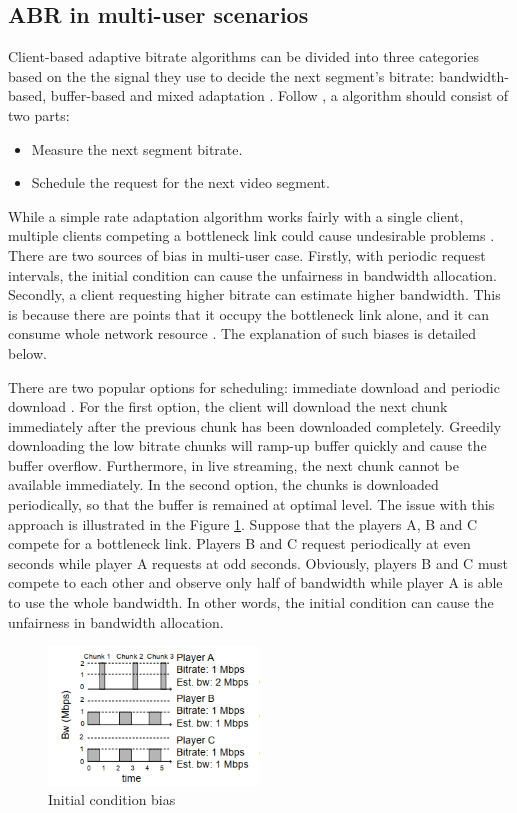 \documentclass[journal]{IEEEtran}
\begin{document}
\subsection{ABR in multi-user scenarios}
Client-based adaptive bitrate algorithms can be divided into three categories based on the the signal they use to decide the next segment's bitrate: bandwidth-based, buffer-based and mixed adaptation \cite{ABR cats}. Follow \cite{PANDA}, a algorithm should consist of two parts: \begin{itemize}
    \item Measure the next segment bitrate.
    \item Schedule the request for the next video segment.
\end{itemize}
\par While a simple rate adaptation algorithm works fairly with a single client, multiple clients competing a bottleneck link could cause undesirable problems \cite{FESTIVE}. There are two sources of bias in multi-user case. Firstly, with periodic request intervals, the initial condition can cause the unfairness in bandwidth allocation. Secondly, a client requesting higher bitrate can estimate higher bandwidth. This is because there are points that it occupy the bottleneck link alone, and it can consume whole network resource \cite{FESTIVE}. The explanation of such biases is detailed below. 
\par There are two popular options for scheduling: immediate download and periodic download \cite{FESTIVE}. For the first option, the client will download the next chunk immediately after the previous chunk has been downloaded completely. Greedily downloading the low bitrate chunks will ramp-up buffer quickly and cause the buffer overflow. Furthermore, in live streaming, the next chunk cannot be available immediately. In the second option, the chunks is downloaded periodically, so that the buffer is remained at optimal level. The issue with this approach is illustrated in the Figure \ref{ini bias}. Suppose that the players A, B and C compete for a bottleneck link. Players B and C request periodically at even seconds while player A requests at odd seconds. Obviously, players B and C must compete to each other and observe only half of bandwidth while player A is able to use the whole bandwidth. In other words, the initial condition can cause the unfairness in bandwidth allocation.
\begin{figure}[!h]
	\centering
	
	\includegraphics[width=0.5\textwidth]{images/IniBias.PNG}
	
	
	
	\caption{Initial condition bias}
	\label {ini bias}
	
\end{figure}
\end{document}
